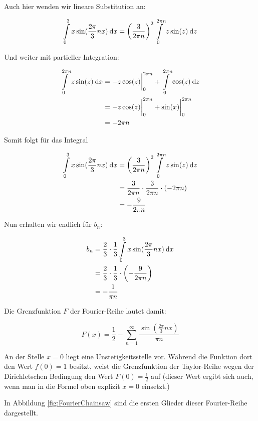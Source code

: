 Auch hier wenden wir lineare Substitution an:

$$
	\int\limits_0^3 x \sin(\frac{2\pi}{3}nx) \:\mathrm{d}{x} = \left(\frac{3}{2\pi n}\right)^2 \int\limits_0^{2\pi n} z \sin(z) \:\mathrm{d}{z}
$$

Und weiter mit partieller Integration:

\begin{alignat*}{1}
	\int\limits_0^{2\pi n} z \sin(z) \:\mathrm{d}{x} &= -z \cos(z)\biggr|_0^{2\pi n} + \int\limits_0^{2\pi n} \cos(z) \:\mathrm{d}{z} \\
	                                          &= -z \cos(z)\biggr|_0^{2\pi n} + \sin(x)\biggr|_0^{2\pi n} \\
	                                          &= -2\pi n
\end{alignat*}

Somit folgt für das Integral

\begin{alignat*}{1}
	\int\limits_0^3 x \sin(\frac{2\pi}{3}nx) \:\mathrm{d}{x} &= \left( \frac{3}{2\pi n}\right)^2 \int\limits_0^{2\pi n} z \sin(z) \:\mathrm{d}{z} \\
	                                                  &= \frac{3}{2\pi n}  \cdot \frac{3}{2\pi n} \cdot (-2\pi n) \\
	                                                  &= -\frac{9}{2\pi n}
\end{alignat*}

Nun erhalten wir endlich für $b_n$:

\begin{alignat*}{1}
	b_n &= \frac{2}{3} \cdot \frac{1}{3} \int\limits_0^3 x \sin(\frac{2\pi}{3}nx) \:\mathrm{d}{x} \\
	    &= \frac{2}{3} \cdot \frac{1}{3} \cdot \left(-\frac{9}{2\pi n}\right) \\
	    &= -\frac{1}{\pi n}
\end{alignat*}

Die Grenzfunktion $F$ der Fourier-Reihe lautet damit:

$$
	F(x) = \frac{1}{2} - \sum\limits_{n=1}^\infty \frac{\sin(\frac{2\pi}{3}nx)}{\pi n}
$$

An der Stelle $x=0$ liegt eine Unstetigkeitsstelle vor. Während die Funktion dort den Wert $f(0)=1$ besitzt, weist die Grenzfunktion der Taylor-Reihe wegen der Dirichletschen Bedingung den Wert $F(0)=\frac{1}{2}$ auf (dieser Wert ergibt sich auch, wenn man in die Formel oben explizit $x=0$ einsetzt.)

In Abbildung \ref{fig:FourierChainsaw} sind die ersten Glieder dieser Fourier-Reihe dargestellt.

